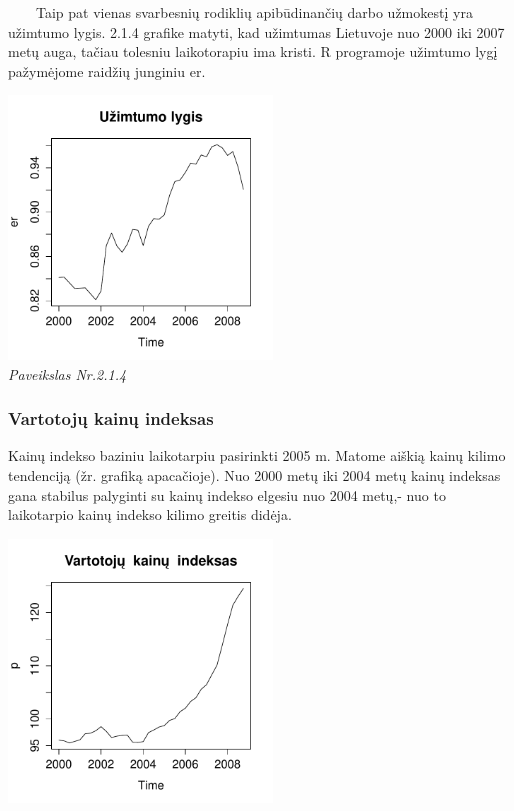 \documentclass[12pt,a4paper]{article}
\theoremstyle{change}\newtheorem{salyga}{Uždavinys}
\begin{document}
\vskip 8pt
$\qquad$Taip pat vienas svarbesnių rodiklių apibūdinančių darbo užmokestį yra užimtumo lygis. 2.1.4 grafike matyti, kad užimtumas Lietuvoje nuo 2000 iki 2007 metų auga, tačiau tolesniu laikotorapiu ima kristi. R programoje užimtumo lygį pažymėjome raidžių junginiu er. 
\begin{center}
\includegraphics[width=70mm,height=70mm]{er}
\\
\textit{Paveikslas Nr.2.1.4}
\end{center}



\subsubsection{Vartotojų kainų indeksas}

\hspace{40pt}Kainų indekso baziniu laikotarpiu pasirinkti 2005 m. Matome aiškią kainų kilimo tendenciją (žr. grafiką apacačioje). Nuo 2000 metų iki 2004 metų kainų indeksas gana stabilus palyginti su kainų indekso elgesiu nuo 2004 metų,- nuo to laikotarpio kainų indekso kilimo greitis didėja. 
\vskip 8pt
\begin{center}
\includegraphics[width=70mm,height=70mm]{p}
\end{center}
\end{document}
